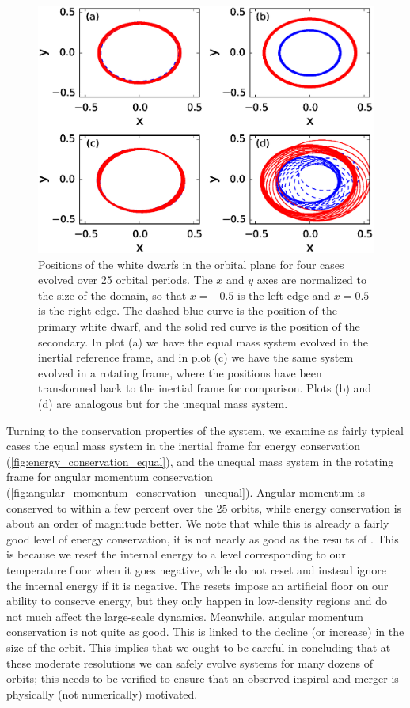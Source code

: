 \documentclass[iop]{../emulateapj}
\begin{document}
\begin{figure}
  \centering
  \includegraphics[scale=0.7]{plots/circular_orbit_comparison}
  \caption{Positions of the white dwarfs in the orbital plane for four cases evolved over 25 orbital periods. 
           The $x$ and $y$ axes are normalized to the size of the domain, so that $x = -0.5$ is the left edge 
           and $x = 0.5$ is the right edge. The dashed blue curve is the position of the primary white dwarf, 
           and the solid red curve is the position of the secondary. In plot (a) we have the equal mass system 
           evolved in the inertial reference frame, and in plot (c) we have the same system evolved in a rotating frame, 
           where the positions have been transformed back to the inertial frame for comparison. 
           Plots (b) and (d) are analogous but for the unequal mass system.\label{fig:circular_orbit_comparison}}
\end{figure}

Turning to the conservation properties of the system, we examine as fairly typical cases the equal mass system 
in the inertial frame for energy conservation (\autoref{fig:energy_conservation_equal}), and the unequal mass 
system in the rotating frame for angular momentum conservation (\autoref{fig:angular_momentum_conservation_unequal}). 
Angular momentum is conserved to within a few percent over the 25 orbits, while energy conservation is about 
an order of magnitude better. We note that while this is already a fairly good level of energy conservation, it is not 
nearly as good as the results of \citet{marcello:2012}. This is because we reset the internal energy to a level 
corresponding to our temperature floor when it goes negative, while \citeauthor{marcello:2012} do not reset and 
instead ignore the internal energy if it is negative. The resets impose an artificial floor on our ability to 
conserve energy, but they only happen in low-density regions and do not much affect the large-scale dynamics. 
Meanwhile, angular momentum conservation is not quite as good. This is linked to the decline (or increase) in 
the size of the orbit. This implies that we ought to be careful in concluding that at these moderate resolutions 
we can safely evolve systems for many dozens of orbits; this needs to be verified to ensure that an observed 
inspiral and merger is physically (not numerically) motivated.
\end{document}
